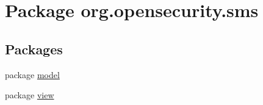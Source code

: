 \hypertarget{a00035}{\section{Package org.\+opensecurity.\+sms}
\label{a00035}
}
\subsection*{Packages}
\begin{DoxyCompactItemize}
\item 
package \hyperlink{a00036}{model}
\item 
package \hyperlink{a00041}{view}
\end{DoxyCompactItemize}
